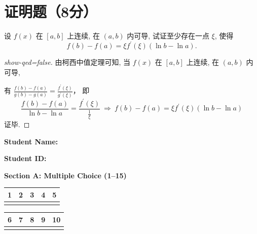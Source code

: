\documentclass{USTBExam}
\begin{document}
\section{证明题（8分）}

\begin{problem}
  设 $f(x)$ 在 $[a, b]$ 上连续, 在 $(a, b)$ 内可导, 试证至少存在一点 $\xi$, 使得
  $$f(b)-f(a)=\xi f^{\prime}(\xi)(\ln b-\ln a).$$
\end{problem}

\begin{proof}[show-qed=false]
  由柯西中值定理可知, 当 $f(x)$ 在 $[a, b]$ 上连续, 在 $(a, b)$ 内可导,

  有
  $\frac{f(b)-f(a)}{g(b)-g(a)}=\frac{f^{\prime}(\xi)}{g^{\prime}(\xi)}$，
  即
  $$\frac{f(b)-f(a)}{\ln b-\ln a}=\frac{f^{\prime}(\xi)}{\frac{1}{\xi}}
    ~\Rightarrow~
    f(b)-f(a)=\xi f^{\prime}(\xi)(\ln b-\ln a) $$
  证毕.
\end{proof}


\newpage

\noindent\textbf{Student Name:} \underline{\hspace{6cm}}

\textbf{Student ID:} \underline{\hspace{6cm}}

\vspace{0.6cm}
\noindent\textbf{Section A: Multiple Choice (1--15)}\\[0.2cm]
\noindent
\begin{tabular}{|c|c|c|c|c|}
\hline
1 & 2 & 3 & 4 & 5  \\
\hline
\underline{\hspace{1.6cm}} & \underline{\hspace{1.6cm}} & \underline{\hspace{1.6cm}} & \underline{\hspace{1.6cm}} & \underline{\hspace{1.6cm}}  \\
\hline
\end{tabular}

\begin{tabular}{|c|c|c|c|c|}
\hline
6 & 7 & 8 & 9 & 10  \\
\hline
\underline{\hspace{1.6cm}} & \underline{\hspace{1.6cm}} & \underline{\hspace{1.6cm}} & \underline{\hspace{1.6cm}} & \underline{\hspace{1.6cm}}  \\
\hline
\end{tabular}
\end{document}
